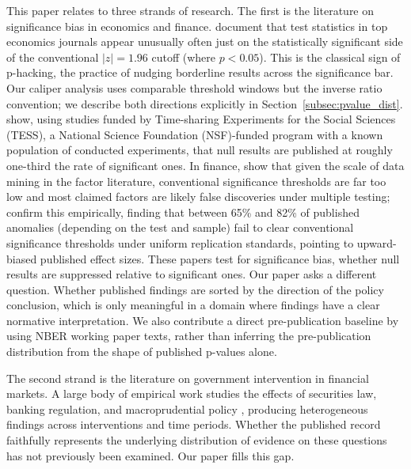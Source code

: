 \documentclass[12pt]{article}
\begin{document}
This paper relates to three strands of research.  The first is the literature
on significance bias in economics and finance.  \citet*{Brodeur2016} document that test statistics in top economics
journals appear unusually often just on the statistically significant
side of the conventional $|z|=1.96$ cutoff (where $p<0.05$).  This
is the classical sign of p-hacking, the practice of nudging
borderline results across the significance bar.  Our caliper analysis uses comparable
threshold windows but the inverse ratio convention; we describe both
directions explicitly in
Section~\ref{subsec:pvalue_dist}.  \citet*{Franco2014} show, using
studies funded by Time-sharing Experiments for the Social Sciences
(TESS), a National Science Foundation (NSF)-funded program with a
known population of conducted
experiments, that null results are published at roughly one-third
the rate of significant ones.  In finance, \citet*{Harvey2016} show that given the scale of data mining
in the factor literature, conventional significance thresholds are far too
low and most claimed factors are likely false discoveries under multiple
testing; \citet*{Hou2020} confirm this empirically, finding that between 65\% and
82\% of published anomalies (depending on the test and sample) fail to
clear conventional significance thresholds under uniform replication
standards, pointing to upward-biased published effect sizes.  These papers test for
significance bias, whether null results are suppressed relative to
significant ones.  Our paper asks a different question.  Whether published
findings are sorted by the direction of the policy conclusion, which
is only meaningful in a domain where findings have a clear normative
interpretation.  We also contribute a direct pre-publication baseline by using
NBER working paper texts, rather than inferring the pre-publication distribution
from the shape of published p-values alone.

The second strand is the literature on government intervention in financial
markets.  A large body of empirical work studies the effects of securities law,
banking regulation, and macroprudential policy \citep*{La_Porta1998,
Berger2017, Agarwal2014}, producing heterogeneous findings across interventions
and time periods.  Whether the published record faithfully represents the
underlying distribution of evidence on these questions has not previously been
examined.  Our paper fills this gap.
\end{document}
